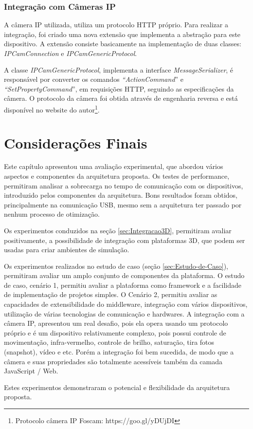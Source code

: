 \subsubsection*{Integração com Câmeras IP}

A câmera IP utilizada, utiliza um protocolo HTTP próprio. Para realizar
a integração, foi criado uma nova extensão que implementa a abstração
para este dispositivo. A extensão consiste basicamente na implementação
de duas classes: \emph{IPCamConnection} e \emph{IPCamGenericProtocol}. 

A classe \emph{IPCamGenericProtocol}, implementa a interface \emph{MessageSerializer},
é responsável por converter os comandos \emph{``ActionCommand}''
e \emph{``SetPropertyCommand}'', em requisições HTTP, seguindo as
especificações da câmera. O protocolo da câmera foi obtida através
de engenharia reversa e está disponível no website do autor\footnote{Protocolo câmera IP Foscam: https://goo.gl/yDUjDI}.


\section{Considerações Finais}

Este capítulo apresentou uma avaliação experimental, que abordou vários
aspectos e componentes da arquitetura proposta. Os testes de performance,
permitiram analisar a sobrecarga no tempo de comunicação com os dispositivos,
introduzido pelos componentes da arquitetura. Bons resultados foram
obtidos, principalmente na comunicação USB, mesmo sem a arquitetura
ter passado por nenhum processo de otimização.

Os experimentos conduzidos na seção \ref{sec:Integracao3D}, permitiram
avaliar positivamente, a possibilidade de integração com plataformas
3D, que podem ser usadas para criar ambientes de simulação.

Os experimentos realizados no estudo de caso (seção \ref{sec:Estudo-de-Caso}),
permitiram avaliar um amplo conjunto de componentes da plataforma.
O estudo de caso, cenário 1, permitiu avaliar a plataforma como framework
e a facilidade de implementação de projetos simples. O Cenário 2,
permitiu avaliar as capacidades de extensibilidade do middleware,
integração com vários dispositivos, utilização de várias tecnologias
de comunicação e hardwares. A integração com a câmera IP, apresentou
um real desafio, pois ela opera usando um protocolo próprio e é um
dispositivo relativamente complexo, pois possui controle de movimentação,
infra-vermelho, controle de brilho, saturação, tira fotos (snapshot),
vídeo e etc. Porém a integração foi bem sucedida, de modo que a câmera
e suas propriedades são totalmente acessíveis também da camada JavaScript
/ Web.

Estes experimentos demonstraram o potencial e flexibilidade da arquitetura
proposta.
